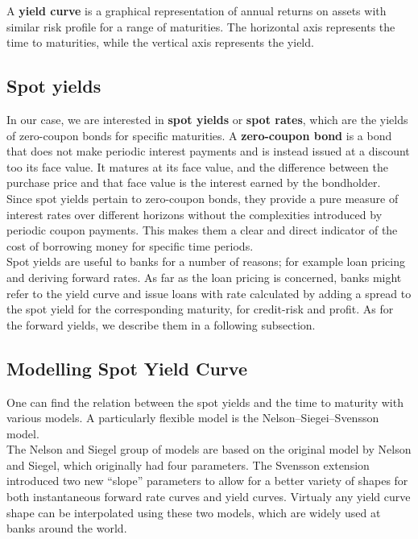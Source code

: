 \documentclass[11pt]{article}
\begin{document}
A \textbf{yield curve} is a graphical representation of annual returns on assets with similar risk profile for a range of maturities. The horizontal axis represents the time to maturities, while the vertical axis represents the yield.

\subsection{Spot yields}

 In our case, we are interested in \textbf{spot yields} or \textbf{spot rates}, which are the yields of zero-coupon bonds for specific maturities. A \textbf{zero-coupon bond} is a bond that does not make periodic interest payments and is instead issued at a discount too its face value. It matures at its face value, and the difference between the purchase price and that face value is the interest earned by the bondholder.\\
 
 Since spot yields pertain to zero-coupon bonds, they provide a pure measure of interest rates over different horizons without the complexities introduced by periodic coupon payments. This makes them a clear and direct indicator of the cost of borrowing money for specific time periods. \\
 
  Spot yields are useful to banks for a number of reasons; for example loan pricing and deriving forward rates. As far as the loan pricing is concerned, banks might refer to the yield curve and issue loans with rate calculated by adding a spread to the spot yield for the corresponding maturity, for credit-risk and profit. As for the forward yields, we describe them in a following subsection.


\subsection{Modelling Spot Yield Curve}

One can find the relation between the spot yields and the time to maturity with various models. A particularly flexible model is the  Nelson--Siegei--Svensson model. \\

The Nelson and Siegel group of models are based on the original model by Nelson and Siegel, which originally had four parameters. The Svensson extension introduced two new “slope” parameters to allow for a better variety of shapes for both instantaneous forward rate curves and yield curves.  Virtualy any yield curve shape can be interpolated using these two models, which are widely used at banks around the world.\\
\end{document}
